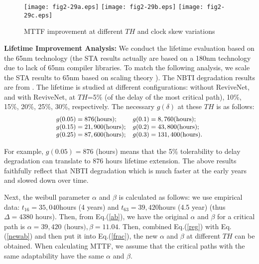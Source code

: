 \begin{figure*}[t]
\centering {}%
{\texttt{[image: fig2-29a.eps]}} \hspace{-0.5cm}
{\texttt{[image: fig2-29b.eps]}}\hspace{-0.5cm}
{\texttt{[image: fig2-29c.eps]}} \vspace{-0.2cm}
\caption{MTTF improvement at different $TH$ and clock skew variations}\label{ex}
\end{figure*}

\textbf{Lifetime Improvement Analysis:} We conduct the lifetime evaluation based on the 65nm technology (the STA results actually are based
on a 180nm technology due to lack of 65nm compiler libraries. To match the following analysis, we
scale the STA results to 65nm based on scaling theory \cite{JMRabaey}). The NBTI degradation
results are from \cite{Impact-of-NBTI_07}. The lifetime is studied at different configurations:
without ReviveNet, and with ReviveNet, at $TH$=5\% (of the delay of the most critical path), 10\%,
15\%, 20\%, 25\%, 30\%, respectively. The necessary $g(\delta)$ at these $TH$ is as follows:
\begin{equation}\label{reg}{\small
\begin{array}{ll}
g(0.05)=876 \mbox{(hours)}; &g(0.1)=8,760 \mbox{(hours)};\\
g(0.15)=21,900 \mbox{(hours)};& g(0.2)=43,800 \mbox{(hours)};\\
g(0.25)=87,600 \mbox{(hours)};& g(0.3)=131,400 \mbox{(hours)}.
\end{array}}
\end{equation}

For example, $g(0.05)=876$ (hours) means that the 5\% tolerability to delay degradation can
translate to 876 hours lifetime extension. The above results faithfully reflect that NBTI
degradation which is much faster at the early years and slowed down over time.

Next, the weibull parameter $\alpha$ and $\beta$ is calculated as follows: we use empirical data:
$t_{16}=35,040$hours (4 years) and $t_{63}=39,420$hours (4.5 year) (thus $\Delta=4380$ hours).
Then, from Eq.(\ref{ab}), we have the original $\alpha$ and $\beta$ for a critical path is
$\alpha=39,420 \mbox{ (hours)}, \beta=11.04$.
Then, combined Eq.(\ref{reg}) with Eq.(\ref{newab}) and then put it into Eq.(\ref{frac}), the new
$\alpha$ and $\beta$ at different $TH$ can be obtained. When calculating MTTF, we
assume that the critical paths with the same adaptability have the same $\alpha$ and $\beta$.

